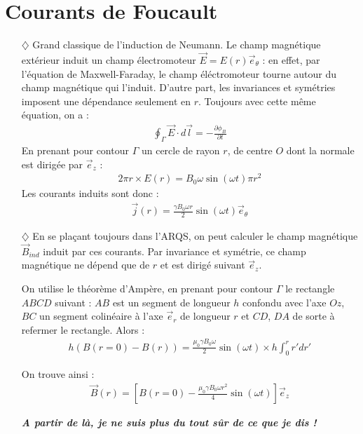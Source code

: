 \documentclass{report}
\begin{document}
\section*{Courants de Foucault}

\begin{itemize}

	\item[$\diamondsuit$] Grand classique de l'induction de Neumann. Le champ magnétique extérieur induit un champ électromoteur $\vec{E}=E(r)\vec{e}_\theta$ : en effet, par l'équation de Maxwell-Faraday, le champ éléctromoteur tourne autour du champ magnétique qui l'induit. D'autre part, les invariances et symétries imposent une dépendance seulement en $r$. Toujours avec cette même équation, on a :
	\begin{align*}
		\oint_\Gamma \vec{E}\cdot d\vec{l} = -\frac{\partial \phi_B}{\partial t}
	\end{align*}	
En prenant pour contour $\Gamma$ un cercle de rayon $r$, de centre $O$ dont la normale est dirigée par $\vec{e}_z$ :
	\begin{align*}
		2\pi r\times E(r)= B_0\omega\sin(\omega t)\pi r^2
	\end{align*}
Les courants induits sont donc :
	\begin{align*}
		 \vec{j}(r)= \frac{\gamma B_0\omega r}{2}\sin(\omega t) \vec{e}_\theta
	\end{align*}

	
	\item[$\diamondsuit$] En se plaçant toujours dans l'ARQS, on peut calculer le champ magnétique $\vec{B}_{ind}$ induit par ces courants. Par invariance et symétrie, ce champ magnétique ne dépend que de $r$ et est dirigé suivant $\vec{e}_z$.
	
	 On utilise le théorème d'Ampère, en prenant pour contour $\Gamma$ le rectangle $ABCD$ suivant : $AB$ est un segment de longueur $h$ confondu avec l'axe $Oz$, $BC$ un segment colinéaire à l'axe $\vec{e}_r$ de longueur $r$ et $CD$, $DA$ de sorte à refermer le rectangle. Alors : 
	\begin{align*}
		h(B(r=0)-B(r))=\frac{\mu_0\gamma B_0\omega }{2}\sin(\omega t)\times h\int_0^r r'dr'
	\end{align*}

On trouve ainsi : 
\begin{align*}
	\vec{B}(r) = \left[ B(r=0) - \frac{\mu_0\gamma B_0\omega r^2}{4}\sin(\omega t)\right] \vec{e}_z
\end{align*}

\textbf{\textit{A partir de là, je ne suis plus du tout sûr de ce que je dis !}}


\end{itemize}
\end{document}
